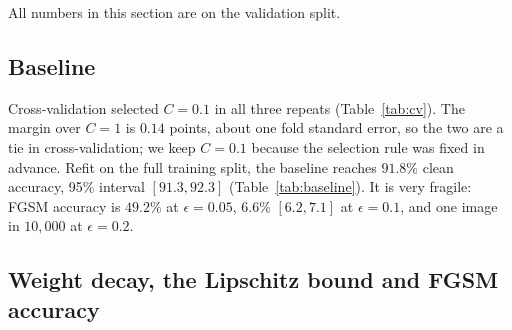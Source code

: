 \documentclass{article}
\newcommand{\fp}{\texttt{fp32}}
\newcommand{\ieight}{\texttt{int8}}
\newcommand{\ifour}{\texttt{int4}}
\begin{document}
All numbers in this section are on the validation split.

\subsection{Baseline}

\begin{table}[t]
  \caption{Tuning the baseline. Mean stratified 5-fold cross-validation accuracy of logistic regression inside the $50{,}000$ training images, averaged over three fold-shuffle seeds; the fold standard error is the standard deviation over the five folds divided by $\sqrt{5}$. $C = 0.1$ is selected in every repeat; $C = 1$ is within about one standard error of it.}
  \label{tab:cv}
  \centering
  \small
  
\end{table}

\begin{table}[t]
  \caption{Baseline result. Logistic regression ($C = 0.1$) on the $10{,}000$ validation images, at three weight precisions. Brackets are 95\% bootstrap intervals ($2{,}000$ resamples of the validation images). $L$ is the exact Lipschitz constant of the logits (spectral norm of the weights). \ieight{} matches \fp{}; \ifour{} costs about half a point of clean accuracy and two points of FGSM accuracy at $\epsilon = 0.05$.}
  \label{tab:baseline}
  \centering
  \small
  
\end{table}

Cross-validation selected $C = 0.1$ in all three repeats (Table~\ref{tab:cv}). The margin over $C = 1$ is $0.14$ points, about one fold standard error, so the two are a tie in cross-validation; we keep $C = 0.1$ because the selection rule was fixed in advance. Refit on the full training split, the baseline reaches $91.8\%$ clean accuracy, 95\% interval $[91.3, 92.3]$ (Table~\ref{tab:baseline}). It is very fragile: FGSM accuracy is $49.2\%$ at $\epsilon = 0.05$, $6.6\%$ $[6.2, 7.1]$ at $\epsilon = 0.1$, and one image in $10{,}000$ at $\epsilon = 0.2$.

\subsection{Weight decay, the Lipschitz bound and FGSM accuracy}

\begin{table}[t]
  \caption{MLP results on the validation split, mean $\pm$ standard deviation over three seeds. Weight decay lowers both Lipschitz bounds and raises FGSM accuracy at $\epsilon = 0.1$; \ieight{} rows match their \fp{} rows; \ifour{} rows differ by a few points in FGSM accuracy, in a direction that depends on weight decay.}
  \label{tab:mlp}
  \centering
  \footnotesize
  \setlength{\tabcolsep}{4pt}
  
\end{table}
\end{document}
